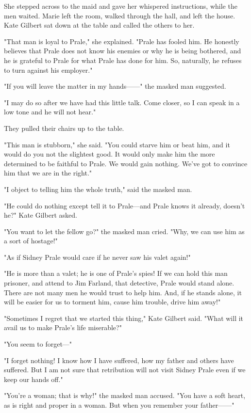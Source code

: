 \documentclass{novel}
\begin{document}
She stepped across to the maid and gave her whispered instructions, while the men waited. Marie left the room, walked through the hall, and left the house. Kate Gilbert sat down at the table and called the others to her.

"That man is loyal to Prale," she explained. "Prale has fooled him. He honestly believes that Prale does not know his enemies or why he is being bothered, and he is grateful to Prale for what Prale has done for him. So, naturally, he refuses to turn against his employer."

"If you will leave the matter in my hands------" the masked man suggested.

"I may do so after we have had this little talk. Come closer, so I can speak in a low tone and he will not hear."

They pulled their chairs up to the table.

"This man is stubborn," she said. "You could starve him or beat him, and it would do you not the slightest good. It would only make him the more determined to be faithful to Prale. We would gain nothing. We've got to convince him that we are in the right."

"I object to telling him the whole truth," said the masked man.

"He could do nothing except tell it to Prale---and Prale knows it already, doesn't he?" Kate Gilbert asked.

"You want to let the fellow go?" the masked man cried. "Why, we can use him as a sort of hostage!"

"As if Sidney Prale would care if he never saw his valet again!"

"He is more than a valet; he is one of Prale's spies! If we can hold this man prisoner, and attend to Jim Farland, that detective, Prale would stand alone. There are not many men he would trust to help him. And, if he stands alone, it will be easier for us to torment him, cause him trouble, drive him away!"

"Sometimes I regret that we started this thing," Kate Gilbert said. "What will it avail us to make Prale's life miserable?"

"You seem to forget---"

"I forget nothing! I know how I have suffered, how my father and others have suffered. But I am not sure that retribution will not visit Sidney Prale even if we keep our hands off."

"You're a woman; that is why!" the masked man accused. "You have a soft heart, as is right and proper in a woman. But when you remember your father------"
\end{document}
